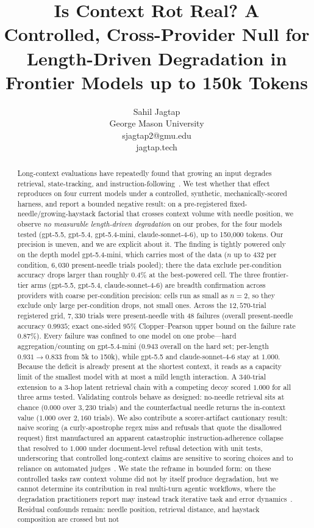 \documentclass[11pt]{article}
\title{Is Context Rot Real? A Controlled, Cross-Provider Null for\\
Length-Driven Degradation in Frontier Models up to 150k Tokens}
\author{Sahil Jagtap \\ George Mason University \\ sjagtap2@gmu.edu \\ jagtap.tech}
\date{}
\begin{document}
\maketitle

\begin{abstract}
Long-context evaluations have repeatedly found that growing an input degrades retrieval, state-tracking, and instruction-following~\cite{hong2025contextrot,liu2024lostmiddle,modarressi2025nolima}. We test whether that effect reproduces on four current models under a controlled, synthetic, mechanically-scored harness, and report a bounded negative result: on a pre-registered fixed-needle/growing-haystack factorial that crosses context volume with needle position, we observe \emph{no measurable length-driven degradation} on our probes, for the four models tested (gpt-5.5, gpt-5.4, gpt-5.4-mini, claude-sonnet-4-6), up to 150{,}000 tokens. Our precision is uneven, and we are explicit about it. The finding is tightly powered only on the depth model gpt-5.4-mini, which carries most of the data ($n$ up to $432$ per condition, $6{,}030$ present-needle trials pooled); there the data exclude per-condition accuracy drops larger than roughly $0.4\%$ at the best-powered cell. The three frontier-tier arms (gpt-5.5, gpt-5.4, claude-sonnet-4-6) are breadth confirmation across providers with coarse per-condition precision: cells run as small as $n=2$, so they exclude only large per-condition drops, not small ones. Across the $12{,}570$-trial registered grid, $7{,}330$ trials were present-needle with $48$ failures (overall present-needle accuracy $0.9935$; exact one-sided $95\%$ Clopper--Pearson upper bound on the failure rate $0.87\%$). Every failure was confined to one model on one probe---hard aggregation/counting on gpt-5.4-mini ($0.943$ overall on the hard set; per-length $0.931 \to 0.833$ from 5k to 150k), while gpt-5.5 and claude-sonnet-4-6 stay at $1.000$. Because the deficit is already present at the shortest context, it reads as a capacity limit of the smallest model with at most a mild length interaction. A $340$-trial extension to a $3$-hop latent retrieval chain with a competing decoy scored $1.000$ for all three arms tested. Validating controls behave as designed: no-needle retrieval sits at chance ($0.000$ over $3{,}230$ trials) and the counterfactual needle returns the in-context value ($1.000$ over $2{,}160$ trials). We also contribute a scorer-artifact cautionary result: naive scoring (a curly-apostrophe regex miss and refusals that quote the disallowed request) first manufactured an apparent catastrophic instruction-adherence collapse that resolved to $1.000$ under document-level refusal detection with unit tests, underscoring that controlled long-context claims are sensitive to scoring choices and to reliance on automated judges~\cite{zheng2023judge}. We state the reframe in bounded form: on these controlled tasks raw context volume did not by itself produce degradation, but we cannot determine its contribution in real multi-turn agentic workflows, where the degradation practitioners report may instead track iterative task and error dynamics~\cite{orlanski2026slopcodebench}. Residual confounds remain: needle position, retrieval distance, and haystack composition are crossed but not 
\end{abstract}
\end{document}
